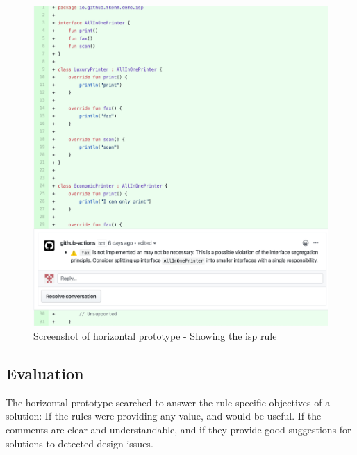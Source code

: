 \documentclass{report}
\begin{document}
\begin{figure}[h!]
    \centering
    \includegraphics[width=\textwidth]{images/final_isp.png}
    \caption{Screenshot of horizontal prototype - Showing the \gls{isp} rule}
    \label{fig:horizontal-prototype}
\end{figure}


\subsection*{Evaluation}

The horizontal prototype searched to answer the rule-specific objectives of a solution: If the rules were providing any value, and would be useful. If the comments are clear and understandable, and if they provide good suggestions for solutions to detected design issues. 
\end{document}
